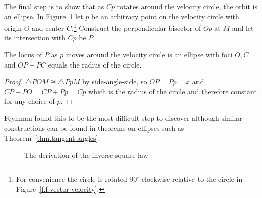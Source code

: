 The final step is to show that as $Cp$ rotates around the velocity circle, the orbit is an ellipse. In Figure~\ref{f.f-elliptical-orbit} let $p$ be an arbitrary point on the velocity circle with origin $O$ and center $C$.\footnote{For convenience the circle is rotated $90^\circ$ clockwise relative to the circle in Figure~\ref{f.f-vector-velocity}.} Construct the perpendicular bisector of $Op$ at $M$ and let its intersection with $Cp$ be $P$.


\begin{theorem}
The locus of $P$ as $p$ moves around the velocity circle is an ellipse with foci $O,C$ and $OP+PC$ equals the radius of the circle.
\end{theorem}
\begin{proof}
$\triangle POM\cong \triangle PpM$ by side-angle-side, so $OP=Pp=x$ and $CP+PO=CP+Pp=Cp$ which is the radius of the circle and therefore constant for any choice of $p$.\fqed
\end{proof} 

Feynman found this to be the most difficult step to discover \cite[p.~130]{lost} although similar constructions can be found in theorems on ellipses such as Theorem~\ref{thm.tangent-angles}.


\begin{figure}
\begin{center}
\caption{The derivation of the inverse square law}\label{f.f-elliptical-orbit}
\end{center}
\end{figure}

